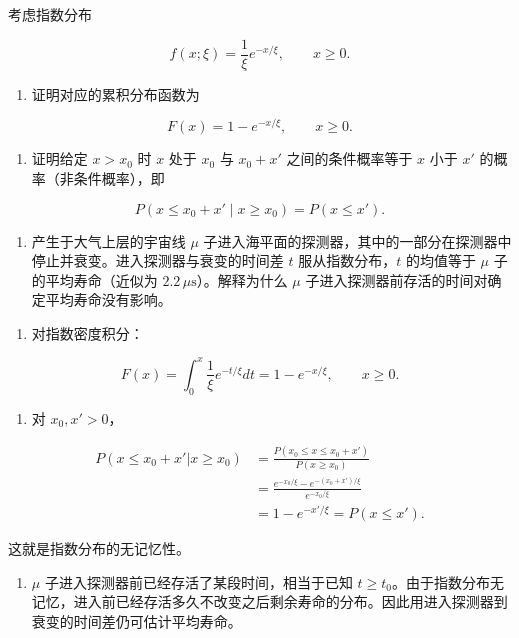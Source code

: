 \begin{question}
考虑指数分布

\[
f(x;\xi)=\frac{1}{\xi}e^{-x/\xi},\qquad x\ge0.
\]

\begin{enumerate}
\item
  证明对应的累积分布函数为
\end{enumerate}

\[
F(x)=1-e^{-x/\xi},\qquad x\ge0.
\]

\begin{enumerate}[start=2]
\item
  证明给定 \(x>x_0\) 时 \(x\) 处于 \(x_0\) 与 \(x_0+x'\)
  之间的条件概率等于 \(x\) 小于 \(x'\) 的概率（非条件概率），即
\end{enumerate}

\[
P(x\le x_0+x'\mid x\ge x_0)=P(x\le x').
\]

\begin{enumerate}[start=3]
\item
  产生于大气上层的宇宙线 \(\mu\)
  子进入海平面的探测器，其中的一部分在探测器中停止并衰变。进入探测器与衰变的时间差
  \(t\) 服从指数分布，\(t\) 的均值等于 \(\mu\) 子的平均寿命（近似为
  \(2.2\,\mu\mathrm{s}\)）。解释为什么 \(\mu\)
  子进入探测器前存活的时间对确定平均寿命没有影响。
\end{enumerate}
\begin{solution}
\begin{enumerate}
\item
  对指数密度积分：
\end{enumerate}

\[
F(x)=\int_0^x\frac1\xi e^{-t/\xi}dt=1-e^{-x/\xi},\qquad x\ge0.
\]

\begin{enumerate}[start=2]
\item
  对 \(x_0,x'>0\)，
\end{enumerate}

\[
\begin{split}
P(x\le x_0+x'|x\ge x_0)
&=\frac{P(x_0\le x\le x_0+x')}{P(x\ge x_0)}\\
&=\frac{e^{-x_0/\xi}-e^{-(x_0+x')/\xi}}{e^{-x_0/\xi}}\\
&=1-e^{-x'/\xi}=P(x\le x').
\end{split}
\]

这就是指数分布的无记忆性。

\begin{enumerate}[start=3]
\item
  \(\mu\) 子进入探测器前已经存活了某段时间，相当于已知
  \(t\ge t_0\)。由于指数分布无记忆，进入前已经存活多久不改变之后剩余寿命的分布。因此用进入探测器到衰变的时间差仍可估计平均寿命。
\end{enumerate}
\end{solution}
\end{question}



